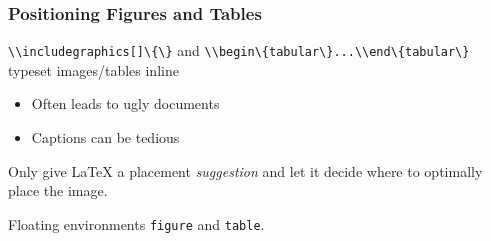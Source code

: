 \begin{frame}
    \frametitle{Positioning Figures and Tables}
    \begin{description}
        \item<+->[Problem] \lstinline|\\includegraphics[]\{\}| and \lstinline|\\begin\{tabular\}...\\end\{tabular\}| typeset images/tables inline
        \begin{itemize}
            \item<+-> Often leads to ugly documents
            \item<+-> Captions can be tedious
        \end{itemize}
        \item<+->[Idea] Only give \LaTeX{} a placement \emph{suggestion} and let it decide where to optimally place the image.
        \item<+->[Solution] Floating environments \texttt{figure} and \texttt{table}.
    \end{description}
\end{frame}
